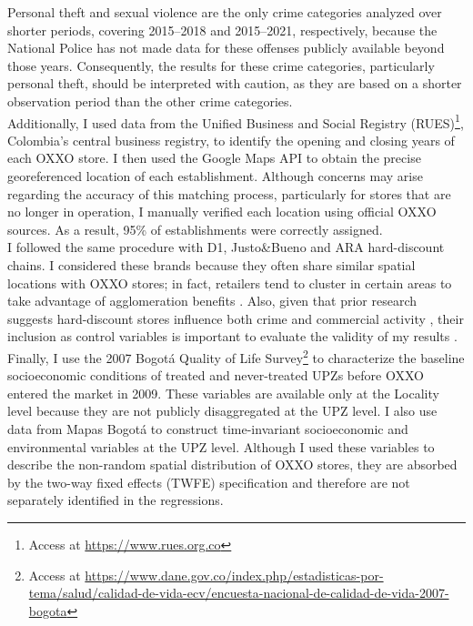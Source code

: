 \documentclass[12pt]{article}
\begin{document}
Personal theft and sexual violence are the only crime categories analyzed over shorter periods, covering 2015–2018 and 2015–2021, respectively, because the National Police has not made data for these offenses publicly available beyond those years. Consequently, the results for these crime categories, particularly personal theft, should be interpreted with caution, as they are based on a shorter observation period than the other crime categories.\\

Additionally, I used data from the Unified Business and Social Registry (RUES)\footnote{Access at \url{https://www.rues.org.co}}, Colombia’s central business registry, to identify the opening and closing years of each OXXO store. I then used the Google Maps API to obtain the precise georeferenced location of each establishment. Although concerns may arise regarding the accuracy of this matching process, particularly for stores that are no longer in operation, I manually verified each location using official OXXO sources. As a result, 95\% of establishments were correctly assigned.\\

I followed the same procedure with D1, Justo\&Bueno and ARA hard-discount chains. I considered these brands because they often share similar spatial locations with OXXO stores; in fact, retailers tend to cluster in certain areas to take advantage of agglomeration benefits \parencite{Konishi2005, Seong2022}. Also, given that prior research suggests hard-discount stores influence both crime and commercial activity \parencite{delgado2024, jaramillo2021low}, their inclusion as control variables is important to evaluate the validity of my results .\\

Finally, I use the 2007 Bogotá Quality of Life Survey\footnote{Access at \url{https://www.dane.gov.co/index.php/estadisticas-por-tema/salud/calidad-de-vida-ecv/encuesta-nacional-de-calidad-de-vida-2007-bogota}} to characterize the baseline socioeconomic conditions of treated and never-treated UPZs before OXXO entered the market in 2009. These variables are available only at the Locality level because they are not publicly disaggregated at the UPZ level. I also use data from Mapas Bogotá to construct time-invariant socioeconomic and environmental variables at the UPZ level. Although I used these variables to describe the non-random spatial distribution of OXXO stores, they are absorbed by the two-way fixed effects (TWFE) specification and therefore are not separately identified in the regressions.
\end{document}

